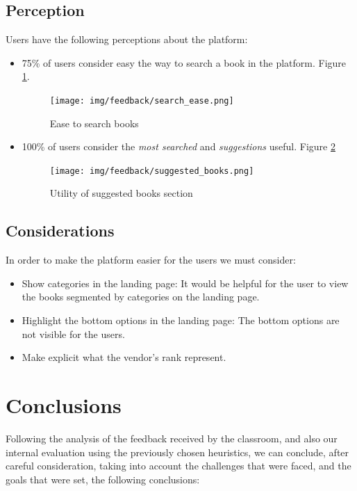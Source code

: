 \documentclass{article}
\begin{document}
\subsection{Perception}
Users have the following perceptions about the platform:
\begin{itemize}
    \item 75\% of users consider easy the way to search a book in the platform. Figure \ref{fig:search_ease}.
    \begin{figure}[h]
        \centering
        \texttt{[image: img/feedback/search\_ease.png]}
        \caption{Ease to search books}
        \label{fig:search_ease}
    \end{figure}
    \item 100\% of users consider the \textit{most searched} and \textit{suggestions} useful. Figure \ref{fig:suggested}
    \begin{figure}[h]
        \centering
        \texttt{[image: img/feedback/suggested\_books.png]}
        \caption{Utility of suggested books section}
        \label{fig:suggested}
    \end{figure}
\end{itemize}

\subsection{Considerations}
In order to make the platform easier for the users we must consider:
\begin{itemize}
    \item Show categories in the landing page: It would be helpful for the user to view the books segmented by categories on the landing page.
    \item Highlight the bottom options in the landing page: The bottom options are not visible for the users.
    \item Make explicit what the vendor's rank represent.
\end{itemize}


\section{Conclusions}
Following the analysis of the feedback received by the classroom, and also our internal evaluation using the previously chosen heuristics, we can conclude, after careful consideration, taking into account the challenges that were faced, and the goals that were set, the following conclusions:
\end{document}
